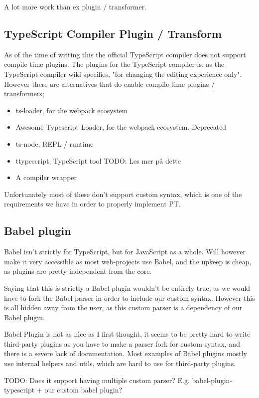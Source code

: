 A lot more work than ex plugin / transformer.

\subsection{TypeScript Compiler Plugin / Transform}\label{subsec:typescript-compiler-plugin}


As of the time of writing this the official TypeScript compiler does not support compile time plugins. The plugins for the TypeScript compiler is, as the TypeScript compiler wiki specifies, "for changing the editing experience only"\cite{tscplugin}.
However there are alternatives that do enable compile time plugins / transformers;

\begin{itemize}
    \item ts-loader\cite{tsloadergithub}, for the webpack ecosystem
    \item Awesome Typescript Loader\cite{awesometypescriptloadergithub}, for the webpack ecosystem. Deprecated
    \item ts-node\cite{tsnodegithub}, REPL / runtime
    \item ttypescript\cite{ttypescriptgithub}, TypeScript tool TODO: Les mer på dette
    \item A compiler wrapper
\end{itemize}

Unfortunately most of these don't support custom syntax, which is one of the requirements we have in order to properly implement PT.


\subsection{Babel plugin}\label{subsec:babel-plugin}

Babel isn't strictly for TypeScript, but for JavaScript as a whole.
Will however make it very accessible as most web-projects use Babel, and the upkeep is cheap, as plugins are pretty independent from the core.

Saying that this is strictly a Babel plugin wouldn't be entirely true, as we would have to fork the Babel parser in order to include our custom syntax\cite{babelparserdocs}.
However this is all hidden away from the user, as this custom parser is a dependency of our Babel plugin.

Babel Plugin is not as nice as I first thought, it seems to be pretty hard to write third-party plugins as you have to make a parser fork for custom syntax, and there is a severe lack of documentation.
Most examples of Babel plugins mostly use internal helpers and utils, which are hard to use for third-party plugins.

TODO: Does it support having multiple custom parser?
E.g. babel-plugin-typescript + our custom babel plugin?
